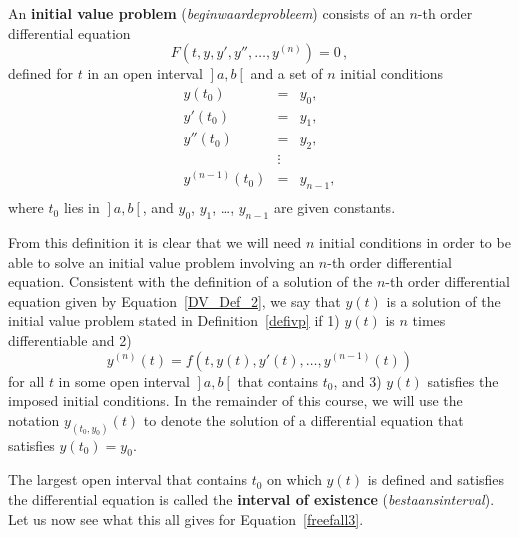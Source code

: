 \begin{definition} 
\label{defivp}
An \textbf{initial value problem} (\textit{beginwaardeprobleem}) consists of an $n$-th order differential equation
$$
F\left(t,y,y',y'',\ldots,y^{(n)}\right)=0\,,
$$
defined for $t$ in an open interval $\left.\right]a,b\left[\right.$ and a set of $n$ initial conditions
$$
\begin{array}{rcl}
y(t_0)&=&y_0,\\
y'(t_0)&=&y_1,\\
y''(t_0)&=&y_2,\\
&\vdots&\\
y^{(n-1)}(t_0)&=&y_{n-1},\\
\end{array} 
$$
where $t_0$ lies in $\left.\right]a,b\left[\right.$, and $y_0$, $y_1$, \ldots, $y_{n-1}$ are given constants.
\end{definition}
From this definition it is clear that we will need $n$ initial conditions in order to be able to solve an initial value problem involving an $n$-th order differential equation. Consistent with the definition of a solution of the $n$-th order differential equation given by Equation~\eqref{DV_Def_2}, we say that $y(t)$ is a solution
of the initial value problem stated in Definition~\ref{defivp} if 1) $y(t)$ is $n$ times
differentiable and 2)
$$
y^{(n)}(t)=f(t,y(t),y'(t), \dots,y^{(n-1)}(t))
$$
for all $t$ in some open interval $\left.\right]a,b\left[\right.$  that contains $t_0$, and 3) $y(t)$ satisfies the imposed initial conditions. In the remainder of this course, we will use the notation $y_{(t_0,y_0)}(t)$ to denote the solution of a differential equation that satisfies $y(t_0)=y_0$. 

The largest open interval that contains $t_0$ on which $y(t)$ is defined and satisfies the differential equation is called the \textbf{interval of existence} (\textit{bestaansinterval}). Let us now see what this all gives for Equation~\eqref{freefall3}. 

